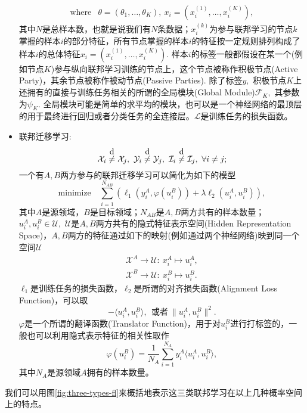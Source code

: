 \begin{itemize}
\begin{equation}
\begin{array}{cl}
\text{where} & \theta = (\theta_{1}, \ldots, \theta_{K}), ~ x_{i} = (x_{i}^{(1)}, \ldots, x_{i}^{(K)}),
\end{array}
\end{equation}
其中$N$是总样本数，也就是说我们有$N$条数据；$x_{i}^{(k)}$为参与联邦学习的节点$k$掌握的样本$i$的部分特征，所有节点掌握的样本$i$的特征按一定规则排列构成了样本$i$的总体特征$x_{i} = (x_{i}^{(1)}, \ldots, x_{i}^{(K)}).$ 样本$i$的标签一般都假设在某一个(例如节点$K$)参与纵向联邦学习训练的节点上，这个节点被称作积极节点(Active Party)，其余节点被称作被动节点(Passive Parties). 除了标签$y,$ 积极节点$K$上还拥有的直接与训练任务相关的所谓的全局模块(Global Module)$\mathcal{F}_K,$ 其参数为$\psi_K.$ 全局模块可能是简单的求平均的模块，也可以是一个神经网络的最顶层的用于最终进行回归或者分类任务的全连接层。$\mathcal{L}$是训练任务的损失函数。
\item 联邦迁移学习:
\begin{equation*}
\mathcal{X}_i \neqabove{d} \mathcal{X}_j, ~ \mathcal{Y}_i \neqabove{d} \mathcal{Y}_j, ~ \mathcal{I}_i \neqabove{d} \mathcal{I}_j, ~ \forall i \neq j;
\end{equation*}
一个有$A, B$两方参与的联邦迁移学习可以简化为如下的模型\cite{liu_2020_transfer_fl}
\begin{equation}
\label{eq:general-ftl}
\text{minimize} \quad \sum_{i=1}^{N_{AB}} \left( \ell_1(y_i^A, \varphi(u_i^B)) + \lambda \ell_2(u_i^A, u_i^B)  \right),
\end{equation}
其中$A$是源领域，$B$是目标领域；$N_{AB}$是$A, B$两方共有的样本数量；$u_i^A, u_i^B \in \mathcal{U},$ $\mathcal{U}$是$A, B$两方共有的隐式特征表示空间(Hidden Representation Space)，$A, B$两方的特征通过如下的映射(例如通过两个神经网络)映到同一个空间$\mathcal{U}$
\begin{gather*}
\mathcal{X}^A \to \mathcal{U}: ~ x_i^A \mapsto u_i^A, \\ \mathcal{X}^B \to \mathcal{U}: ~ x_i^B \mapsto u_i^B.
\end{gather*}
$\ell_1$是训练任务的损失函数，$\ell_2$是所谓的对齐损失函数(Alignment Loss Function)，可以取
\begin{equation*}
- \langle u_i^A, u_i^B \rangle, ~~ \text{或者} ~ \lVert u_i^A, u_i^B \rVert^2.
\end{equation*}
$\varphi$是一个所谓的翻译函数(Translator Function)，用于对$u_i^B$进行打标签的，一般也可以利用隐式表示特征的相关性取作
\begin{equation}
\label{eq:ftl-translator-func}
\varphi(u_i^B) = \frac{1}{N_A} \sum\limits_{i=1}^{N_A} y_i^A \langle u_i^A, u_i^B \rangle,
\end{equation}
其中$N_{A}$是源领域$A$拥有的样本数量。
\end{itemize}
我们可以用图\ref{fig:three-types-fl}来概括地表示这三类联邦学习在以上几种概率空间上的特点。


